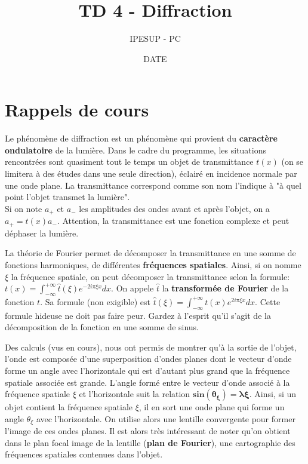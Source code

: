 \documentclass{article}
\title{TD 4 - Diffraction}
\author{IPESUP - PC }
\date{DATE}
\begin{document}
\maketitle

\section{Rappels de cours}

Le phénomène de diffraction est un phénomène qui provient du \textbf{caractère ondulatoire } de la lumière. 
Dans le cadre du programme, les situations rencontrées sont quasiment tout le temps un objet de transmittance $t(x)$ (on se limitera à des études dans une seule direction), éclairé en incidence normale par une onde plane.
La transmittance correspond comme son nom l'indique à "à quel point l'objet transmet la lumière".\\
Si on note $a_+$ et $a_-$ les amplitudes des ondes avant et après l'objet, on a $a_+ = t(x) a_-$.
Attention, la transmittance est une fonction complexe et peut déphaser la lumière. 

La théorie de Fourier permet de décomposer la transmittance en une somme de fonctions harmoniques, de différentes \textbf{fréquences spatiales}. 
Ainsi, si on nomme $\xi$ la fréquence spatiale, on peut décomposer la transmittance selon la formule: $t(x) = \int_{- \infty}^{+ \infty} \hat{t}(\xi) e^{-2i \pi\xi x} dx$.
On appele $\hat{t}$ la \textbf{transformée de Fourier} de la fonction $t$.
Sa formule (non exigible) est $\hat{t}(\xi) = \int_{- \infty}^{+ \infty} t(x) e^{2i \pi \xi x} dx$.
Cette formule hideuse ne doit pas faire peur. Gardez à l'esprit qu'il s'agit de la décomposition de la fonction en une somme de sinus. 

Des calculs (vus en cours), nous ont permis de montrer qu'à la sortie de l'objet, l'onde est composée d'une superposition d'ondes planes dont le vecteur d'onde forme un angle avec l'horizontale qui est d'autant plus grand que la fréquence spatiale associée est grande.
L'angle formé entre le vecteur d'onde associé à la fréquence spatiale $\xi$ et l'horizontale suit la relation $\boldsymbol{ sin(\theta_\xi) = \lambda \xi}. $
Ainsi, si un objet contient la fréquence spatiale $\xi$, il en sort une onde plane qui forme un angle $\theta_\xi$ avec l'horizontale.
On utilise alors une lentille convergente pour former l'image de ces ondes planes. 
Il est alors très intéressant de noter qu'on obtient dans le plan focal image de la lentille (\textbf{plan de Fourier}), une cartographie des fréquences spatiales contenues dans l'objet.
\end{document}
